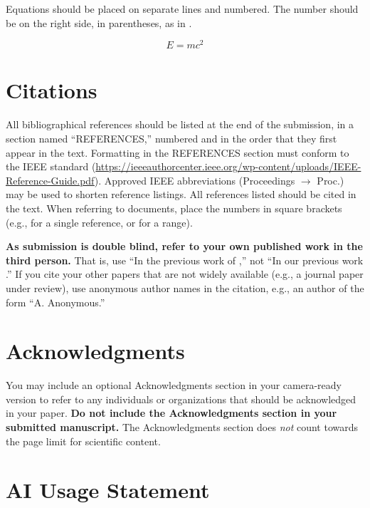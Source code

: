 \documentclass{article}
\begin{document}
Equations should be placed on separate lines and numbered. The number should be on the right side, in parentheses, as in .

\begin{equation}\label{relativity}
E=mc^{2}
\end{equation}

\section{Citations}

All bibliographical references should be listed at the end of the submission, in a section named ``REFERENCES,'' numbered and in the order that they first appear in the text. Formatting in the REFERENCES section must conform to the IEEE standard (\url{https://ieeeauthorcenter.ieee.org/wp-content/uploads/IEEE-Reference-Guide.pdf}). Approved IEEE abbreviations (Proceedings $\rightarrow$ Proc.) may be used to shorten reference listings. All references listed should be cited in the text. When referring to documents, place the numbers in square brackets (e.g., \cite{Mueller21_FMP_SPRINGER} for a single reference, or \cite{KneesS16_MusicSimilarityRetrieval_SPRINGER,WeihsJVR16_MusicDataAnalysis_CRC,Lerch23_AudioContentAnalysis_WILEY,SerraEtAl13_RoadmapMIR_CreativeCommon} for a range).

\textbf{As submission is double blind, refer to your own published work in the third person.} That is, use ``In the previous work of \cite{Mueller21_FMP_SPRINGER},'' not ``In our previous work \cite{Lerch23_AudioContentAnalysis_WILEY}.'' If you cite your other papers that are not widely available (e.g., a journal paper under review), use anonymous author names in the citation, e.g., an author of the form ``A. Anonymous.''

\section{Acknowledgments}

You may include an optional Acknowledgments section in your camera-ready version to refer to any individuals or organizations that should be acknowledged in your paper. \textbf{Do not include the Acknowledgments section in your submitted manuscript.} The Acknowledgments section does \textit{not} count towards the page limit for scientific content.

\section{AI Usage Statement}
\end{document}
